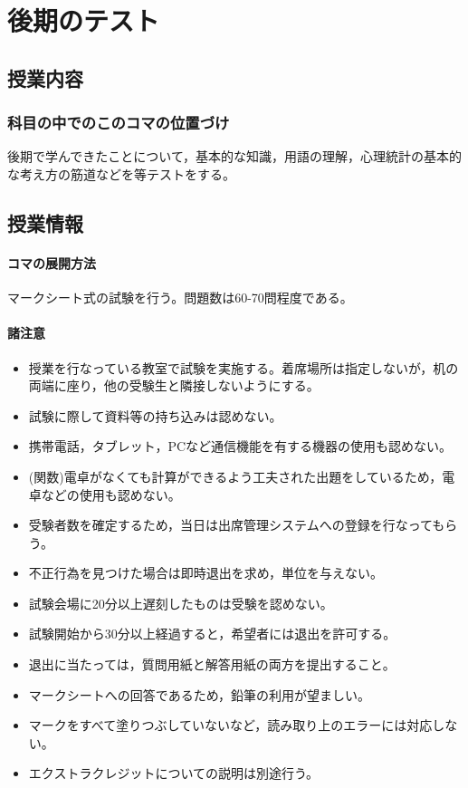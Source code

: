 \section{後期のテスト}
\label{s30_SecondSemester_test}

\subsection{授業内容}
\subsubsection{科目の中でのこのコマの位置づけ}
後期で学んできたことについて，基本的な知識，用語の理解，心理統計の基本的な考え方の筋道などを等テストをする。
\subsection{授業情報}
\paragraph{コマの展開方法}
マークシート式の試験を行う。問題数は60-70問程度である。
\paragraph{諸注意}
\begin{itemize}
	\item 授業を行なっている教室で試験を実施する。着席場所は指定しないが，机の両端に座り，他の受験生と隣接しないようにする。
	\item 試験に際して資料等の持ち込みは認めない。
	\item 携帯電話，タブレット，PCなど通信機能を有する機器の使用も認めない。
	\item (関数)電卓がなくても計算ができるよう工夫された出題をしているため，電卓などの使用も認めない。
	\item 受験者数を確定するため，当日は出席管理システムへの登録を行なってもらう。
	\item 不正行為を見つけた場合は即時退出を求め，単位を与えない。
	\item 試験会場に20分以上遅刻したものは受験を認めない。
	\item 試験開始から30分以上経過すると，希望者には退出を許可する。
	\item 退出に当たっては，質問用紙と解答用紙の両方を提出すること。
	\item マークシートへの回答であるため，鉛筆の利用が望ましい。
	\item マークをすべて塗りつぶしていないなど，読み取り上のエラーには対応しない。
	\item エクストラクレジットについての説明は別途行う。
\end{itemize}
